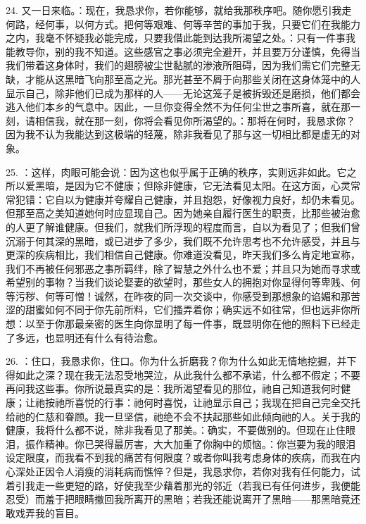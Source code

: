 24. 又一日来临。：现在，我恳求你，若你能够，就给我那秩序吧。随你愿引我走何路，经何事，以何方式。把何等艰难、何等辛苦的事加于我，只要它们在我能力之内，我毫不怀疑我必能完成，只要我借此能到达我所渴望之处。：只有一件事我能教导你，别的我不知道。这些感官之事必须完全避开，并且要万分谨慎，免得当我们带着这身体时，我们的翅膀被尘世黏腻的渗液所阻碍，因为我们需它们完整无缺，才能从这黑暗飞向那至高之光。那光甚至不屑于向那些关闭在这身体笼中的人显示自己，除非他们已成为那样的人——无论这笼子是被拆毁还是磨损，他们都会逃入他们本乡的气息中。因此，一旦你变得全然不为任何尘世之事所喜，就在那一刻，请相信我，就在那一刻，你将会看见你所渴望的。：那将在何时，我恳求你？因为我不认为我能达到这极端的轻蔑，除非我看见了那与这一切相比都是虚无的对象。\par

25. ：这样，肉眼可能会说：因为这也似乎属于正确的秩序，实则远非如此。它之所以爱黑暗，是因为它不健康；但除非健康，它无法看见太阳。在这方面，心灵常常犯错：它自以为健康并夸耀自己健康，并且抱怨，好像视力良好，却仍未看见。但那至高之美知道她何时应显现自己。因为她亲自履行医生的职责，比那些被治愈的人更了解谁健康。但我们，就我们所浮现的程度而言，自以为看见了；但我们曾沉溺于何其深的黑暗，或已进步了多少，我们既不允许思考也不允许感受，并且与更深的疾病相比，我们相信自己健康。你难道没看见，昨天我们多么肯定地宣称，我们不再被任何邪恶之事所羁绊，除了智慧之外什么也不爱；并且只为她而寻求或希望别的事物？当我们谈论娶妻的欲望时，那些女人的拥抱对你显得何等卑贱、何等污秽、何等可憎！诚然，在昨夜的同一次交谈中，你感受到那想象的谄媚和那苦涩的甜蜜如何不同于你先前所料，它们搔弄着你；确实远不如往常，但也远非你所想：以至于你那最亲密的医生向你显明了每一件事，既显明你在他的照料下已经走了多远，也显明还有什么有待治愈。\par

26. ：住口，我恳求你，住口。你为什么折磨我？你为什么如此无情地挖掘，并下得如此之深？现在我无法忍受地哭泣，从此我什么都不承诺，什么都不假定；不要再问我这些事。你所说最真实的是：我所渴望看见的那位，祂自己知道我何时健康；让祂按祂所喜悦的行事：祂何时喜悦，让祂显示自己；我现在把自己完全交托给祂的仁慈和眷顾。我一旦坚信，祂绝不会不扶起那些如此倾向祂的人。关于我的健康，我将什么都不说，除非我看见了那美。：确实，不要做别的。但现在止住眼泪，振作精神。你已哭得最厉害，大大加重了你胸中的烦恼。：你岂要为我的眼泪设定限度，而我看不到我的痛苦有何限度？或者你叫我考虑身体的疾病，而我在内心深处正因令人消瘦的消耗病而憔悴？但是，我恳求你，若你对我有任何能力，试着引我走一些更短的路，好使我至少藉着那光的邻近（若我已有任何进步，我便能忍受）而羞于把眼睛撤回我所离开的黑暗；若我还能说离开了黑暗——那黑暗竟还敢戏弄我的盲目。\par

